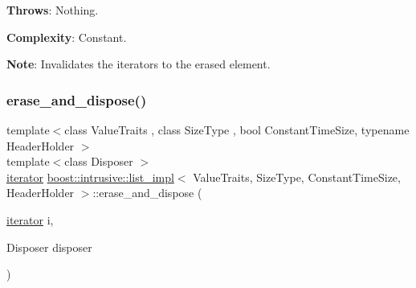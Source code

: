 {\bfseries Throws}\+: Nothing.

{\bfseries Complexity}\+: Constant.

{\bfseries Note}\+: Invalidates the iterators to the erased element. \mbox{\label{classboost_1_1intrusive_1_1list__impl_a3947df03a2116c6de2eb06148793164f}} 
\subsubsection{\texorpdfstring{erase\+\_\+and\+\_\+dispose()}{erase\_and\_dispose()}\hspace{0.1cm}{\footnotesize\ttfamily [2/3]}}
{\footnotesize\ttfamily template$<$class Value\+Traits , class Size\+Type , bool Constant\+Time\+Size, typename Header\+Holder $>$ \\
template$<$class Disposer $>$ \\
\hyperlink{classboost_1_1intrusive_1_1list__impl_a15c0189bf62eb9fb98bc07ef10b8cb23}{iterator} \hyperlink{classboost_1_1intrusive_1_1list__impl}{boost\+::intrusive\+::list\+\_\+impl}$<$ Value\+Traits, Size\+Type, Constant\+Time\+Size, Header\+Holder $>$\+::erase\+\_\+and\+\_\+dispose (\begin{DoxyParamCaption}\item[{\hyperlink{classboost_1_1intrusive_1_1list__impl_a15c0189bf62eb9fb98bc07ef10b8cb23}{iterator}}]{i,  }\item[{Disposer}]{disposer }\end{DoxyParamCaption})\hspace{0.3cm}{\ttfamily [inline]}}

\mbox{\label{classboost_1_1intrusive_1_1list__impl_a9c68fe0a61da85e83ebe11bc02283bef}} 
